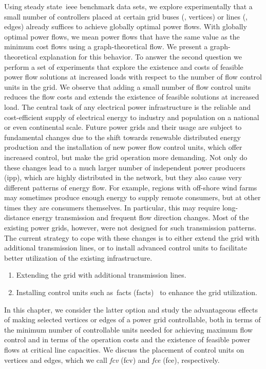 Using steady state~\gls{ieee} benchmark data sets, we explore experimentally
that a small number of controllers placed at certain grid buses (\ie, vertices)
or lines (\ie, edges) already suffices to achieve globally optimal power flows.
With globally optimal power flows, we mean power flows that have the same value
as the minimum cost flows using a graph-theoretical flow. We present a
graph-theoretical explanation for this behavior. To answer the second question
we perform a set of experiments that explore the existence and costs of feasible
power flow solutions at increased loads with respect to the number of flow
control units in the grid. We observe that adding a small number of flow control
units reduces the flow costs and extends the existence of feasible solutions at
increased load.
%
The central task of any electrical power infrastructure is the reliable and
cost-efficient supply of electrical energy to industry and population on a
national or even continental scale. Future power grids and their usage are
subject to fundamental changes due to the shift towards renewable distributed
energy production and the installation of new power flow control units, which
offer increased control, but make the grid operation more demanding. Not only do
these changes lead to a much larger number of independent power producers
(\gls{ipp}), which are highly distributed in the network, but they also
cause very different patterns of energy flow. For example, regions with
off-shore wind farms may sometimes produce enough energy to supply remote
consumers, but at other times they are consumers themselves. In particular, this
may require long-distance energy transmission and frequent flow direction
changes. Most of the existing power grids, however, were not designed for such
transmission patterns. The current strategy to cope with these changes is to
either extend the grid with additional transmission lines, or to install
advanced control units to facilitate better utilization of the existing
infrastructure.
% 
\clearpage
{}
\begin{enumerate}[(S1)]

    \item Extending the grid with additional transmission lines. 
    \label{ch:facts:strategy1}
    \item Installing control units such as~\acrlong{facts}
    (\gls{facts})~\cite{206621} to enhance the grid utilization.
    \label{ch:facts:strategy2}
\end{enumerate}
% 
In this chapter, we consider the latter option and study the advantageous
effects of making selected vertices or edges of a power grid controllable,
both in terms of the minimum number of controllable units needed for achieving
maximum flow control and in terms of the operation costs and the existence of
feasible power flows at critical line capacities. We discuss the placement of
control units on vertices and edges, which we call \emph{\acrlong{fcv}}
(\gls{fcv}) and \emph{\acrlong{fce}} (\gls{fce}), respectively.

